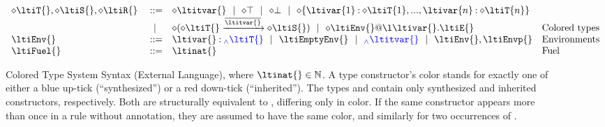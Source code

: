 \begin{figure}
$$\begin{array}{lrll}
\ltiSynChk{\ltiT{}}, \ltiSynChk{\ltiS{}}, \ltiSynChk{\ltiR{}} &::=& 
                         \ltiSynChk{\ltitvar{}} \alt
                         \ltiSynChk{\ltiTop} \alt
                         \ltiSynChk{\ltiBot} \alt
                         \ltiSynChk{\ltiRec{\hastype{\ltivar{1}}{\ltiSynChk{\ltiT{1}}},...,\hastype{\ltivar{n}}{\ltiSynChk{\ltiT{n}}}}}
                                    \\&\alt&
                         \ltiSynChk{\ltiArrow{\ltiSynChk{\ltiT{}}}{\ova{\ltitvar{}}}{\ltiSynChk{\ltiS{}}}} \alt
                         \ltiSynChk{\ltiClosure{\ltiEnv{}}{\ltiufun{\ltivar{}}{\ltiE{}}}}
                      &\mbox{Colored types} \\
  \ltiEnv{} &::=& \hastype{\ltivar{}}{\ltiSyn{\ltiT{}}} \alt
                  \ltiEmptyEnv{} \alt
                  \ltiSyn{\ltitvar{}} \alt
                  \ltiEnvConcat{\ltiEnv{}}{\ltiEnvp{}}
                      &\mbox{Environments} \\
  \ltiFuel{} &::=& \ltinat{}
                      &\mbox{Fuel} \\
\end{array}
$$
\caption{Colored Type System Syntax (External Language),
  where $\ltinat{} \in \mathbb{N}$.
A type constructor's color \ltiSynChk{} stands for exactly one of either a blue up-tick \ltiSyn{} (``synthesized'')
or a red down-tick \ltiChk{} (``inherited'').
The types \ltiSyn{\ltiT{}} and \ltiChk{\ltiT{}} contain only synthesized and inherited constructors, respectively.
Both are structurally equivalent to \ltiSynChk{\ltiT{}}, differing only in color.
If the same constructor appears more than once in a rule without annotation,
they are assumed to have the same color, and similarly for two occurrences of \ltiSynChk{\ltiT{}}.
}
\end{figure}

